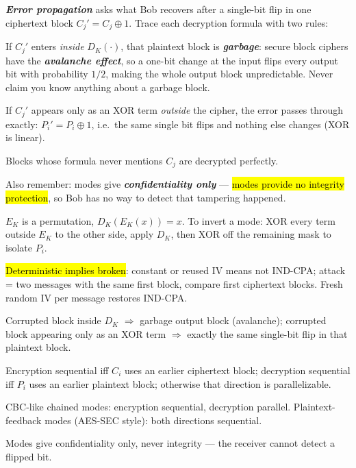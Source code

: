 \documentclass[12pt, a4paper]{article}
\newcommand{\term}[1]{\textbf{\textit{#1}}}        %
\newcommand{\imp}[1]{\hl{#1}}                       %
\begin{document}
\term{Error propagation} asks what Bob recovers after a single-bit flip in one ciphertext block $C_j' = C_j \oplus 1$. Trace each decryption formula with two rules: \begin{tightitem} \item If $C_j'$ enters \emph{inside} $D_K(\cdot)$, that plaintext block is \term{garbage}: secure block ciphers have the \term{avalanche effect}, so a one-bit change at the input flips every output bit with probability $1/2$, making the whole output block unpredictable. Never claim you know anything about a garbage block. \item If $C_j'$ appears only as an XOR term \emph{outside} the cipher, the error passes through exactly: $P_i' = P_i \oplus 1$, i.e.\ the same single bit flips and nothing else changes (XOR is linear). \item Blocks whose formula never mentions $C_j$ are decrypted perfectly. \end{tightitem} Also remember: modes give \term{confidentiality only} --- \imp{modes provide no integrity protection}, so Bob has no way to detect that tampering happened.

\begin{theorybox}
\begin{tightitem}
    \item $E_K$ is a permutation, $D_K(E_K(x)) = x$. To invert a mode: XOR every term outside $E_K$ to the other side, apply $D_K$, then XOR off the remaining mask to isolate $P_i$.
    \item \imp{Deterministic implies broken}: constant or reused IV means not IND-CPA; attack = two messages with the same first block, compare first ciphertext blocks. Fresh random IV per message restores IND-CPA.
    \item Corrupted block inside $D_K$ $\Rightarrow$ garbage output block (avalanche); corrupted block appearing only as an XOR term $\Rightarrow$ exactly the same single-bit flip in that plaintext block.
    \item Encryption sequential iff $C_i$ uses an earlier ciphertext block; decryption sequential iff $P_i$ uses an earlier plaintext block; otherwise that direction is parallelizable.
    \item CBC-like chained modes: encryption sequential, decryption parallel. Plaintext-feedback modes (AES-SEC style): both directions sequential.
    \item Modes give confidentiality only, never integrity --- the receiver cannot detect a flipped bit.
\end{tightitem}
\end{theorybox}
\end{document}
